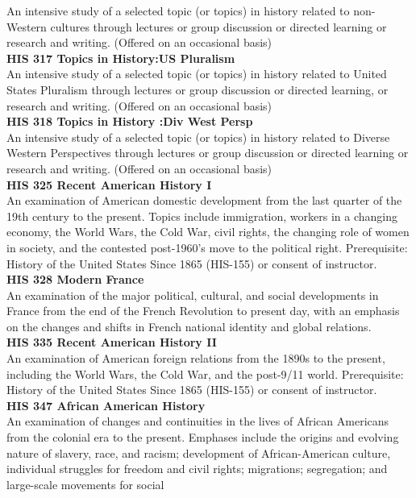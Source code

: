 \documentclass[
  letterpaper,
]{scrbook}
\begin{document}
An intensive study of a selected topic (or topics) in history related to
non-Western cultures through lectures or group discussion or directed
learning or research and writing. (Offered on an occasional basis)\\
\textbf{HIS 317 Topics in History:US Pluralism}\\
An intensive study of a selected topic (or topics) in history related to
United States Pluralism through lectures or group discussion or directed
learning, or research and writing. (Offered on an occasional basis)\\
\textbf{HIS 318 Topics in History :Div West Persp}\\
An intensive study of a selected topic (or topics) in history related to
Diverse Western Perspectives through lectures or group discussion or
directed learning or research and writing. (Offered on an occasional
basis)\\
\textbf{HIS 325 Recent American History I}\\
An examination of American domestic development from the last quarter of
the 19th century to the present. Topics include immigration, workers in
a changing economy, the World Wars, the Cold War, civil rights, the
changing role of women in society, and the contested post-1960's move to
the political right. Prerequisite: History of the United States Since
1865 (HIS-155) or consent of instructor.\\
\textbf{HIS 328 Modern France}\\
An examination of the major political, cultural, and social developments
in France from the end of the French Revolution to present day, with an
emphasis on the changes and shifts in French national identity and
global relations.\\
\textbf{HIS 335 Recent American History II}\\
An examination of American foreign relations from the 1890s to the
present, including the World Wars, the Cold War, and the post-9/11
world. Prerequisite: History of the United States Since 1865 (HIS-155)
or consent of instructor.\\
\textbf{HIS 347 African American History}\\
An examination of changes and continuities in the lives of African
Americans from the colonial era to the present. Emphases include the
origins and evolving nature of slavery, race, and racism; development of
African-American culture, individual struggles for freedom and civil
rights; migrations; segregation; and large-scale movements for social
\end{document}
